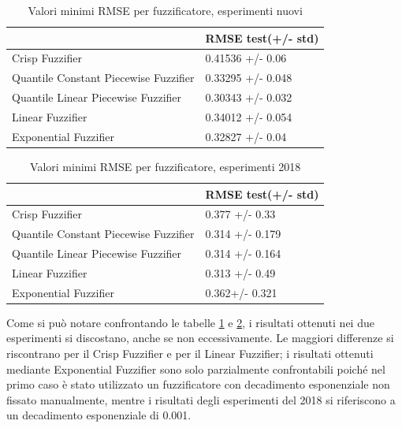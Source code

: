 \documentclass[12pt,a4paper]{report}
\begin{document}
\begin{table}[h!]
\centering 	
	\begin{tabular}{|l|l|} 
	 \hline
	  & RMSE test(+/- std) \\ [0.5ex] 
	 \hline
	 Crisp Fuzzifier & 0.41536 +/- 0.06\\ 
	 \hline
	 Quantile Constant Piecewise Fuzzifier & 0.33295 +/- 0.048\\
	 \hline
	 Quantile Linear Piecewise Fuzzifier & 0.30343 +/- 0.032\\
	 \hline
	 Linear Fuzzifier & 0.34012 +/- 0.054\\
	 \hline
	 Exponential Fuzzifier & 0.32827 +/- 0.04\\ [1ex] 
	 \hline
	\end{tabular}
	\caption{Valori minimi RMSE per fuzzificatore, esperimenti nuovi}
	\label{table: risultatiNuoviEsperimenti}
\end{table}

\begin{table}[h!]
\centering 	
	\begin{tabular}{|l|l|} 
	 \hline
	  & RMSE test(+/- std) \\ [0.5ex] 
	 \hline
	 Crisp Fuzzifier & 0.377 +/- 0.33\\ 
	 \hline
	 Quantile Constant Piecewise Fuzzifier & 0.314 +/- 0.179\\
	 \hline
	 Quantile Linear Piecewise Fuzzifier &  0.314 +/- 0.164\\
	 \hline
	 Linear Fuzzifier &  0.313 +/- 0.49 \\
	 \hline
	 Exponential Fuzzifier & 0.362+/- 0.321\\ [1ex] 
	 \hline
	\end{tabular}
	\caption{Valori minimi RMSE per fuzzificatore, esperimenti 2018}
	\label{table: risultatiVecchiEsperimenti}
\end{table}

Come si può notare confrontando le tabelle \ref{table: risultatiNuoviEsperimenti} e \ref{table: risultatiVecchiEsperimenti}, i risultati ottenuti nei due esperimenti si discostano, anche se non eccessivamente.
Le maggiori differenze si riscontrano per il Crisp Fuzzifier e per il Linear Fuzzifier; i risultati ottenuti mediante Exponential Fuzzifier sono solo parzialmente confrontabili poiché nel primo caso è stato utilizzato un fuzzificatore con decadimento esponenziale non fissato manualmente, mentre i risultati degli esperimenti del 2018 si riferiscono a un decadimento esponenziale di 0.001.
\end{document}
